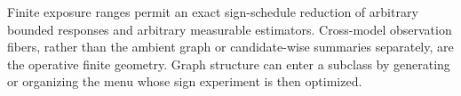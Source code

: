 Finite exposure ranges permit an exact sign-schedule reduction of arbitrary bounded responses and arbitrary measurable estimators. Cross-model observation fibers, rather than the ambient graph or candidate-wise summaries separately, are the operative finite geometry. Graph structure can enter a subclass by generating or organizing the menu whose sign experiment is then optimized.